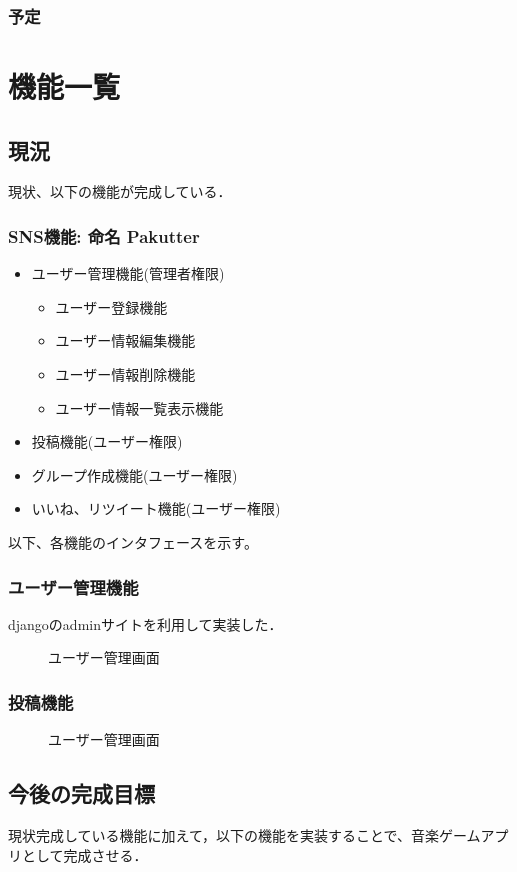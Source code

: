 \documentclass[a4j]{jarticle}
\begin{document}
\subsubsection{予定}
\section{機能一覧}
\subsection{現況}  
現状、以下の機能が完成している．
\subsubsection*{SNS機能: 命名 Pakutter}
\begin{itemize}
  \item ユーザー管理機能(管理者権限)
  \begin{itemize}
    \item ユーザー登録機能
    \item ユーザー情報編集機能
    \item ユーザー情報削除機能
    \item ユーザー情報一覧表示機能
  \end{itemize}
  \item 投稿機能(ユーザー権限)
  \item グループ作成機能(ユーザー権限)
  \item いいね、リツイート機能(ユーザー権限)
\end{itemize}
以下、各機能のインタフェースを示す。
\subsubsection{ユーザー管理機能}
djangoのadminサイトを利用して実装した．
\begin{figure}[htbp]
  \centering
  \caption{ユーザー管理画面}
\end{figure}

\subsubsection{投稿機能}

\begin{figure}[htbp]
  \centering
  \caption{ユーザー管理画面}
\end{figure}

\subsection{今後の完成目標}
現状完成している機能に加えて，以下の機能を実装することで、音楽ゲームアプリとして完成させる．
\end{document}
